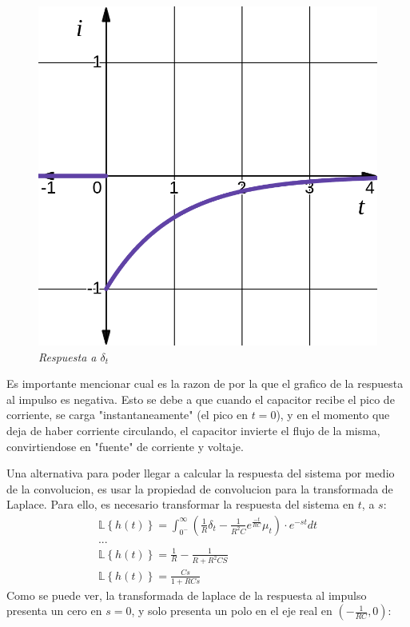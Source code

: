 \documentclass[12pt,a4paper]{report}
\begin{document}
\begin{enumerate}[label=\alph*)]
\begin{figure}[h]
\begin{minipage}[h]{0.4\textwidth}
          \includegraphics[width=1\textwidth]{./images/ej4.3.png}
          \textit{Respuesta a $\delta_t$}
        \end{minipage}
      \end{figure}

      Es importante mencionar cual es la razon de por la que el grafico de la respuesta al impulso es negativa.
      Esto se debe a que cuando el capacitor recibe el pico de corriente, se carga "instantaneamente"
      (el pico en $t=0$), y en el momento que deja de haber corriente circulando, el capacitor invierte el flujo de la
      misma, convirtiendose en "fuente" de corriente y voltaje.

      Una alternativa para poder llegar a calcular la respuesta del sistema por medio de la convolucion, es usar la
      propiedad de convolucion para la transformada de Laplace. Para ello, es necesario transformar la respuesta del
      sistema en $t$, a $s$:
      \begin{gather*}
        \mathbb{L}\left\{h(t)\right\} = \int_{0^-}^{\infty} \left(\frac{1}{R} \delta_t - \frac{1}{R^2C}e^{\frac{-t}{RC}} 
          \mu_t\right) \cdot e^{-st} dt\\
        ...\\
        \mathbb{L}\left\{h(t)\right\} = \frac{1}{R} - \frac{1}{R+R^2CS}\\
        \mathbb{L}\left\{h(t)\right\} = \frac{Cs}{1+RCs}
      \end{gather*}
      Como se puede ver, la transformada de laplace de la respuesta al impulso presenta un cero en $s = 0$, y solo
      presenta un polo en el eje real en $\left(-\frac{1}{RC},0\right)$:


\end{enumerate}
\end{document}
